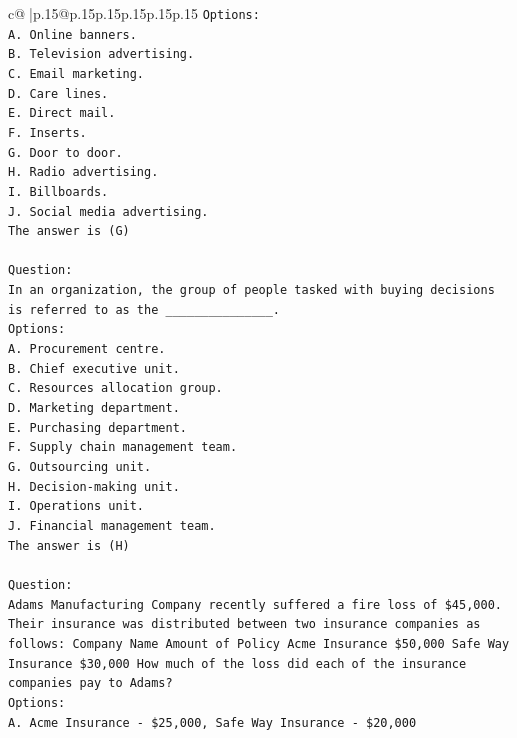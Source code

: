 \documentclass{article}
\begin{document}
{\begin{supertabular}{c@{$\;$}|p{.15\linewidth}@{}p{.15\linewidth}p{.15\linewidth}p{.15\linewidth}p{.15\linewidth}p{.15\linewidth}}
{{{\texttt{Options:} \\
\texttt{A. Online banners.} \\
\texttt{B. Television advertising.} \\
\texttt{C. Email marketing.} \\
\texttt{D. Care lines.} \\
\texttt{E. Direct mail.} \\
\texttt{F. Inserts.} \\
\texttt{G. Door to door.} \\
\texttt{H. Radio advertising.} \\
\texttt{I. Billboards.} \\
\texttt{J. Social media advertising.} \\
\texttt{The answer is (G)} \\
\\ 
\texttt{Question:} \\
\texttt{In an organization, the group of people tasked with buying decisions is referred to as the \_\_\_\_\_\_\_\_\_\_\_\_\_\_\_.} \\
\texttt{Options:} \\
\texttt{A. Procurement centre.} \\
\texttt{B. Chief executive unit.} \\
\texttt{C. Resources allocation group.} \\
\texttt{D. Marketing department.} \\
\texttt{E. Purchasing department.} \\
\texttt{F. Supply chain management team.} \\
\texttt{G. Outsourcing unit.} \\
\texttt{H. Decision{-}making unit.} \\
\texttt{I. Operations unit.} \\
\texttt{J. Financial management team.} \\
\texttt{The answer is (H)} \\
\\ 
\texttt{Question:} \\
\texttt{Adams Manufacturing Company recently suffered a fire loss of \$45,000. Their insurance was distributed between two insurance companies as follows: Company Name Amount of Policy Acme Insurance \$50,000 Safe Way Insurance \$30,000 How much of the loss did each of the insurance companies pay to Adams?} \\
\texttt{Options:} \\
\texttt{A. Acme Insurance {-} \$25,000, Safe Way Insurance {-} \$20,000} \\
}}}
\end{supertabular}}
\end{document}
